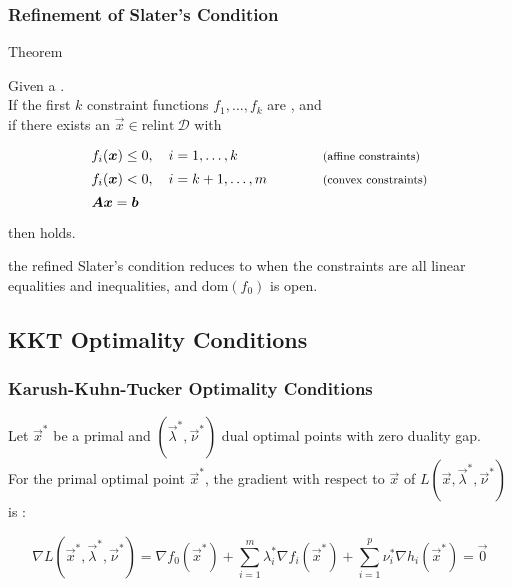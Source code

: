 \begin{frame}
  \frametitle{Refinement of Slater's Condition}

  \begin{citeblock}{Theorem}

    Given a . \\[.2cm]

    If the first $k$ constraint functions $f_1, \ldots, f_k$ are , and \\
    if there exists an $\vec{x} \in \text{relint}~\mathcal{D}$ with
    \small
    \begin{displaymath}
      \renewcommand\arraystretch{1.4}      
      \begin{array}{l l}
        f_i(\vec{x}) \le 0, \quad i=1,\dots,k                   & \text{\footnotesize (affine constraints)}\\
        f_i(\vec{x}) <   0, \quad i=k+1, \ldots, m \qquad \quad & \text{\footnotesize (convex constraints)}\\
        \mat{A}\vec{x} = \vec{b} & \\
      \end{array}
    \end{displaymath}
    then  holds.
  \end{citeblock}
  \pause

  \vspace{.3cm} 
   the refined Slater's condition reduces to  when the constraints are all linear equalities and inequalities, and $\text{dom}(f_0)$ is open.  
\end{frame}


\subsection{KKT Optimality Conditions}

\begin{frame}
  \frametitle{Karush-Kuhn-Tucker Optimality Conditions}

  Let $\vec x^*$ be a primal and $(\vec \lambda^*, \vec \nu^*)$ dual optimal points with zero duality gap. \\[.3cm]

  For the primal optimal point $\vec x^*$, the gradient with respect to $\vec x$ of $L(\vec x, \vec \lambda^*, \vec \nu^*)$ is :
 
  \begin{displaymath}
    \nabla L(\vec x^*, \vec \lambda^*, \vec \nu^*) = 
    \nabla f_0(\vec{x}^*) + 
    \sum_{i=1}^m \lambda_i^* \nabla f_i(\vec{x}^*) + 
    \sum_{i=1}^p \nu_i^* \nabla h_i(\vec{x}^*) = 
    \vec{0}
  \end{displaymath}
\end{frame}


